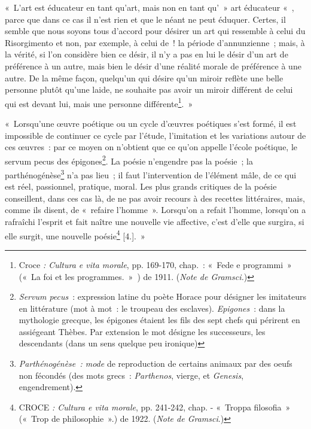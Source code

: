 \documentclass[french,twoside]{book} %
\newenvironment{quoteblock}%
  {\begin{quoting}}
  {\end{quoting}}
\newenvironment{quotebar}{%
    \def\FrameCommand{{\color{rubric!10!}\vrule width 0.5em} \hspace{0.9em}}%
    \def\OuterFrameSep{\itemsep} %
    \MakeFramed {\advance\hsize-\width \FrameRestore}
  }%
  {%
    \endMakeFramed
  }
\renewenvironment{quoteblock}%
  {%
    \savenotes
    \setstretch{0.9}
    \normalfont
    \begin{quotebar}
  }
  {%
    \end{quotebar}
    \spewnotes
  }
\begin{document}
\begin{quoteblock}
 \noindent « L'art est éducateur en tant qu’art, mais non en tant qu’ » art éducateur « , parce que dans ce cas il n’est rien et que le néant ne peut éduquer. Certes, il semble que nous soyons tous d’accord pour désirer un art qui ressemble à celui du Risorgimento et non, par exemple, à celui de ! la période d’annunzienne ; mais, à la vérité, si l’on considère bien ce désir, il n’y a pas en lui le désir d’un art de préférence à un autre, mais bien le désir d’une réalité morale de préférence à une autre. De la même façon, quelqu’un qui désire qu’un miroir reflète une belle personne plutôt qu’une laide, ne souhaite pas avoir un miroir différent de celui qui est devant lui, mais une personne différente\footnote{Croce \emph{: Cultura e vita morale}, pp. 169-170, chap. : « Fede e programmi » (« La foi et les programmes. » ) de 1911. (\emph{Note de Gramsci.})}. »\par
 « Lorsqu’une œuvre poétique ou un cycle d’œuvres poétiques s’est formé, il est impossible de continuer ce cycle par l’étude, l’imitation et les variations autour de ces œuvres : par ce moyen on n’obtient que ce qu’on appelle l’école poétique, le servum pecus des épigones\footnote{\emph{Servum pecus} : expression latine du poète Horace pour désigner les imitateurs en littérature (mot à mot : le troupeau des esclaves). \emph{Epigones} : dans la mythologie grecque, les épigones étaient les fils des sept chefs qui périrent en assiégeant Thèbes. Par extension le mot désigne les successeurs, les descendants (dans un sens quelque peu ironique)}. La poésie n’engendre pas la poésie ; la parthénogénèse\footnote{\emph{Parthénogénèse : mode} de reproduction de certains animaux par des oeufs non fécondés (des mots grecs : \emph{Parthenos}, vierge, et \emph{Genesis}, engendrement).} n’a pas lieu ; il faut l’intervention de l’élément mâle, de ce qui est réel, passionnel, pratique, moral. Les plus grands critiques de la poésie conseillent, dans ces cas là, de ne pas avoir recours à des recettes littéraires, mais, comme ils disent, de « refaire l’homme ». Lorsqu’on a refait l’homme, lorsqu’on a rafraîchi l’esprit et fait naître une nouvelle vie affective, c’est d’elle que surgira, si elle surgit, une nouvelle poésie\footnote{CROCE \emph{: Cultura e vita morale}, pp. 241-242, chap. - « Troppa filosofia » (« Trop de philosophie ».) de 1922. (\emph{Note de Gramsci}.)} [4.]. »
\end{quoteblock}
\end{document}
